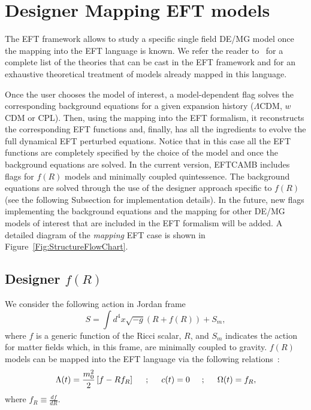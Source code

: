 \documentclass[prd,nofootinbib,showpacs]{revtex4}
\def\l{\left}
\def\r{\right}
\begin{document}
{\section{Designer Mapping EFT models}\label{Sec:MatchingEFT}
%
The EFT framework allows to study a specific single field DE/MG model once the mapping into the EFT language is known. We refer the reader to~\cite{Gubitosi:2012hu,Bloomfield:2012ff,Gleyzes:2013ooa,Bloomfield:2013efa} for a complete list of the theories that can be cast in the EFT framework and  for an exhaustive theoretical treatment of models already mapped in this language. 

Once the user chooses the model of interest, a model-dependent flag solves the corresponding background equations for a given expansion history ($\Lambda$CDM, $w$CDM or CPL). Then, using the mapping into the EFT formalism, it reconstructs the corresponding EFT functions and, finally, has all the ingredients to evolve the full dynamical EFT perturbed equations.
Notice that in this case all the EFT functions are completely specified by the choice of the model and once the background equations are solved. 
In the current version,  EFTCAMB includes flags for $f(R)$ models and  minimally coupled quintessence. The background equations are solved through the use of the designer approach specific to $f(R)$~\cite{Song:2006ej,Pogosian:2007sw} (see the following Subsection for implementation details). In the future, new flags implementing the background equations and the mapping for other DE/MG models of interest that are included in the EFT formalism will be added. A detailed diagram of the \textit{mapping} EFT case is shown in Figure~\ref{Fig:StructureFlowChart}.
\subsection{Designer $f(R)$}\label{SubSec:DesignerFR}
We consider the following action in Jordan frame
\begin{equation} 
S=\int d^4x \sqrt{-g} \l(R+f(R)\r)+S_m, 
\end{equation}
where $f$ is a generic function of the Ricci scalar, $R$, and $S_m$ indicates the action for matter fields which, in this frame, are minimally coupled to gravity.
$f(R)$ models can  be mapped into the EFT language via the following relations~\cite{Gubitosi:2012hu}:
\begin{align} \label{Eq:MatchingFR}
\Lambda(t)=\frac{m_0^2}{2}\l[f- Rf_R \r] \hspace{0.5cm};\hspace{0.5cm} c(t)=0 \hspace{0.5cm};\hspace{0.5cm} \Omega(t)=f_R,
\end{align}
where $f_R\equiv\frac{df}{dR}$. 

}
\end{document}
